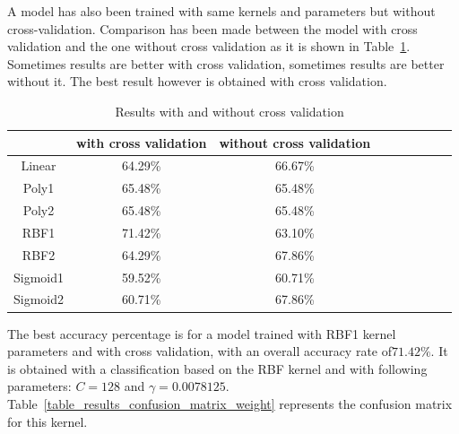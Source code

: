 \noindent A model has also been trained with same kernels and parameters but without cross-validation. Comparison has been made between the model with cross validation and the one without cross validation as it is shown in  Table~\ref{table_results_crossvalidation_weight}. Sometimes results are better with cross validation, sometimes results are better without it. The best result however is obtained with cross validation.
\newline

\begin{table}[h]
\begin{center}
   \caption{\label{table_results_crossvalidation_weight} Results with and without cross validation}
\begin{tabular}{|c|c|c|c|c|c|c|c|c|}
  \hline
    & with cross validation & without cross validation \\
  \hline
  Linear & 64.29\% & 66.67\% \\
  Poly1 & 65.48\% & 65.48\% \\
  Poly2 & 65.48\% & 65.48\% \\
  RBF1 & 71.42\% & 63.10\% \\
  RBF2 & 64.29\% & 67.86\% \\
  Sigmoid1 & 59.52\% & 60.71\% \\
  Sigmoid2 & 60.71\% & 67.86\% \\
  \hline
\end{tabular}
\end{center}
\end{table}

\noindent The best accuracy percentage is for a model trained with RBF1 kernel parameters and with cross validation, with an overall accuracy rate of$ 71.42\% $. It is obtained with a classification based on the RBF kernel and with following parameters: $ C = 128 $ and $ \gamma = 0.0078125 $. Table~\ref{table_results_confusion_matrix_weight} represents the confusion matrix for this kernel.
\newline

